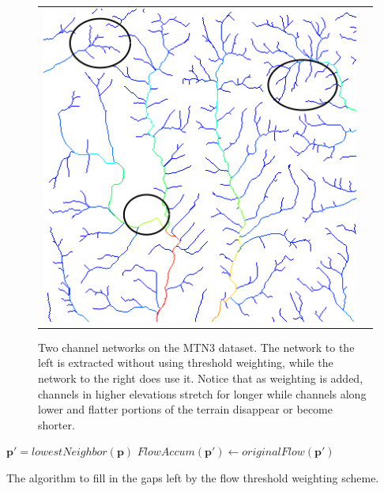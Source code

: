 \begin{figure}[t]
\begin{tabular}{c|c}
\begin{minipage}[b]{0.45\linewidth}
\begin{center}
\includegraphics[width=\linewidth]{images/2DWithThresholdWeighting_mtn3_annotated.png}
\end{center}
\end{minipage} 
\end{tabular}
\caption[Two channel networks on MTN3, one without weighting and the other with.]{\label{figure:WithAndWithoutThresholdWeights} Two channel networks on the MTN3 dataset. The network to the left is extracted without using threshold weighting, while the network to the right does use it. Notice that as weighting is added, channels in higher elevations stretch for longer while channels along lower and flatter portions of the terrain disappear or become shorter. }
\end{figure}


\begin{algorithm}[t]
\begin{algorithmic}
      \STATE $\textbf{p}' = lowestNeighbor( \textbf{p} )$
      \STATE $FlowAccum( \textbf{p}' ) \gets originalFlow( \textbf{p}' )$
    \ENDIF
  \ENDFOR 
\end{algorithmic}
\caption[Algorithm to fill in the gaps left by the flow threshold weighting scheme]{\label{algorithm:ChannelGapFilling}The algorithm to fill in the gaps left by the flow threshold weighting scheme.}
\end{algorithm}

